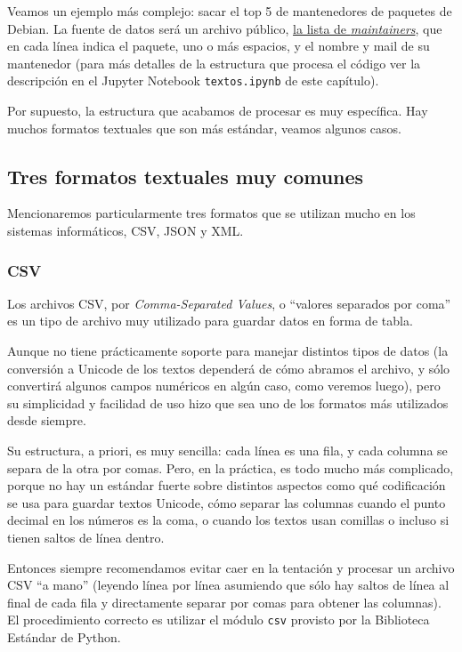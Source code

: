 
Veamos un ejemplo más complejo: sacar el top 5 de mantenedores de paquetes de Debian. La fuente de datos será un archivo público, \href{http://ftp.uk.debian.org/debian/indices/Maintainers}{la lista de \textit{maintainers}}, que en cada línea indica el paquete, uno o más espacios, y el nombre y mail de su mantenedor (para más detalles de la estructura que procesa el código ver la descripción en el Jupyter Notebook \texttt{textos.ipynb} de este capítulo).


Por supuesto, la estructura que acabamos de procesar es muy específica. Hay muchos formatos textuales que son más estándar, veamos algunos casos.


\subsection{Tres formatos textuales muy comunes}

Mencionaremos particularmente tres formatos que se utilizan mucho en los sistemas informáticos, CSV, JSON y XML.

\subsubsection{CSV}
\label{subs:datosCSV}

Los archivos CSV, por \textit{Comma-Separated Values}, o ``valores separados por coma'' es un tipo de archivo muy utilizado para guardar datos en forma de tabla.

Aunque no tiene prácticamente soporte para manejar distintos tipos de datos (la conversión a Unicode de los textos dependerá de cómo abramos el archivo, y sólo convertirá algunos campos numéricos en algún caso, como veremos luego), pero su simplicidad y facilidad de uso hizo que sea uno de los formatos más utilizados desde siempre.

Su estructura, a priori, es muy sencilla: cada línea es una fila, y cada columna se separa de la otra por comas. Pero, en la práctica, es todo mucho más complicado, porque no hay un estándar fuerte sobre distintos aspectos como qué codificación se usa para guardar textos Unicode, cómo separar las columnas cuando el punto decimal en los números es la coma, o cuando los textos usan comillas o incluso si tienen saltos de línea dentro.

Entonces siempre recomendamos evitar caer en la tentación y procesar un archivo CSV ``a mano'' (leyendo línea por línea asumiendo que sólo hay saltos de línea al final de cada fila y directamente separar por comas para obtener las columnas). El procedimiento correcto es utilizar el módulo \texttt{csv} provisto por la Biblioteca Estándar de Python.

